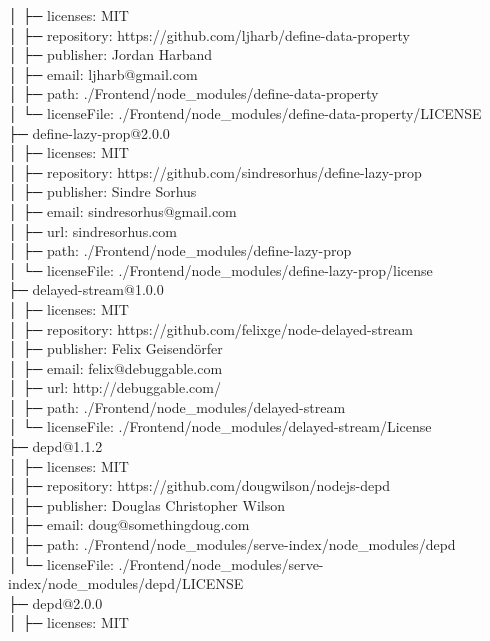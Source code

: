 │  ├─ licenses: MIT\\
│  ├─ repository: https://github.com/ljharb/define-data-property\\
│  ├─ publisher: Jordan Harband\\
│  ├─ email: ljharb@gmail.com\\
│  ├─ path: ./Frontend/node\_modules/define-data-property\\
│  └─ licenseFile: ./Frontend/node\_modules/define-data-property/LICENSE\\
├─ define-lazy-prop@2.0.0\\
│  ├─ licenses: MIT\\
│  ├─ repository: https://github.com/sindresorhus/define-lazy-prop\\
│  ├─ publisher: Sindre Sorhus\\
│  ├─ email: sindresorhus@gmail.com\\
│  ├─ url: sindresorhus.com\\
│  ├─ path: ./Frontend/node\_modules/define-lazy-prop\\
│  └─ licenseFile: ./Frontend/node\_modules/define-lazy-prop/license\\
├─ delayed-stream@1.0.0\\
│  ├─ licenses: MIT\\
│  ├─ repository: https://github.com/felixge/node-delayed-stream\\
│  ├─ publisher: Felix Geisendörfer\\
│  ├─ email: felix@debuggable.com\\
│  ├─ url: http://debuggable.com/\\
│  ├─ path: ./Frontend/node\_modules/delayed-stream\\
│  └─ licenseFile: ./Frontend/node\_modules/delayed-stream/License\\
├─ depd@1.1.2\\
│  ├─ licenses: MIT\\
│  ├─ repository: https://github.com/dougwilson/nodejs-depd\\
│  ├─ publisher: Douglas Christopher Wilson\\
│  ├─ email: doug@somethingdoug.com\\
│  ├─ path: ./Frontend/node\_modules/serve-index/node\_modules/depd\\
│  └─ licenseFile: ./Frontend/node\_modules/serve-index/node\_modules/depd/LICENSE\\
├─ depd@2.0.0\\
│  ├─ licenses: MIT\\
